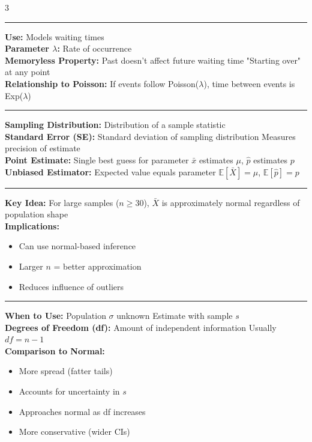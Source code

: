 \documentclass[8pt, letterpaper]{article}
\newcommand{\sectionhead}[1]{%
    \vspace{1.2mm}{\large\bfseries#1}\vspace{0.2mm}\hrule\vspace{0.8mm}%
}
\newcommand{\E}{\mathbb{E}}
\begin{document}
\begin{multicols}{3}
\sectionhead{Exponential Distribution}

\textbf{Use:} Models waiting times \\[1mm]
\textbf{Parameter $\lambda$:} Rate of occurrence \\[1mm]
\textbf{Memoryless Property:}
Past doesn't affect future waiting time
"Starting over" at any point \\[1mm]
\textbf{Relationship to Poisson:}
If events follow Poisson($\lambda$),
time between events is Exp($\lambda$)

\sectionhead{Sampling Concepts}

\textbf{Sampling Distribution:}
Distribution of a sample statistic \\
\textbf{Standard Error (SE):}
Standard deviation of sampling distribution
Measures precision of estimate \\
\textbf{Point Estimate:}
Single best guess for parameter
$\bar{x}$ estimates $\mu$, $\hat{p}$ estimates $p$ \\[1mm]
\textbf{Unbiased Estimator:}
Expected value equals parameter
$\E[\bar{X}] = \mu$, $\E[\hat{p}] = p$

\sectionhead{Central Limit Theorem}

\textbf{Key Idea:}
For large samples ($n \ge 30$),
$\bar{X}$ is approximately normal
regardless of population shape \\
\textbf{Implications:}
\begin{itemize}
    \item Can use normal-based inference
    \item Larger $n$ = better approximation
    \item Reduces influence of outliers
\end{itemize}

\columnbreak



\sectionhead{T-Distribution}

\textbf{When to Use:}
Population $\sigma$ unknown 
Estimate with sample $s$ \\
\textbf{Degrees of Freedom (df):}
Amount of independent information
Usually $df = n-1$ \\
\textbf{Comparison to Normal:}
\begin{itemize}
    \item More spread (fatter tails)
    \item Accounts for uncertainty in $s$
    \item Approaches normal as df increases
    \item More conservative (wider CIs)
\end{itemize}


\end{multicols}
\end{document}
